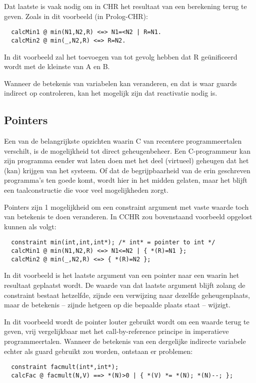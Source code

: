 Dat laatste is vaak nodig om in CHR het resultaat van een berekening terug te geven. Zoals in dit voorbeeld (in Prolog-CHR): \begin{Verbatim}
  calcMin1 @ min(N1,N2,R) <=> N1=<N2 | R=N1.
  calcMin2 @ min(_,N2,R) <=> R=N2.
\end{Verbatim}
In dit voorbeeld zal het toevoegen van  tot gevolg hebben dat R ge\"unificeerd wordt met de kleinste van A en B.

Wanneer de betekenis van variabelen kan veranderen, en dat is waar guards indirect op controleren, kan het mogelijk zijn dat reactivatie nodig is.

\subsection{Pointers}

Een van de belangrijkste opzichten waarin C van recentere programmeertalen verschilt, is de mogelijkheid tot direct geheugenbeheer. Een C-programmeur kan zijn programma eender wat laten doen met het deel (virtueel) geheugen dat het (kan) krijgen van het systeem. Of dat de begrijpbaarheid van de erin geschreven programma's ten goede komt, wordt hier in het midden gelaten, maar het blijft een taalconstructie die voor veel mogelijkheden zorgt.

Pointers zijn 1 mogelijkheid om een constraint argument met vaste waarde toch van betekenis te doen veranderen. In CCHR
zou bovenstaand voorbeeld opgelost kunnen als volgt: \begin{Verbatim}
  constraint min(int,int,int*); /* int* = pointer to int */
  calcMin1 @ min(N1,N2,R) <=> N1<=N2 | { *(R)=N1 };
  calcMin2 @ min(_,N2,R) <=> { *(R)=N2 };
\end{Verbatim}

In dit voorbeeld is het laatste argument van  een pointer naar een  waarin het resultaat geplaatst wordt. De waarde van dat laatste argument blijft zolang de constraint bestaat hetzelfde, zijnde een verwijzing naar dezelfde geheugenplaats, maar de betekenis -- zijnde hetgeen op die bepaalde plaats staat -- wijzigt.

In dit voorbeeld wordt de pointer louter gebruikt wordt om een waarde terug te geven, vrij vergelijkbaar met het call-by-reference principe in imperatieve programmeertalen. Wanneer de betekenis van een dergelijke indirecte variabele echter als guard gebruikt zou worden, ontstaan er problemen: \begin{Verbatim}
  constraint facmult(int*,int*);
  calcFac @ facmult(N,V) ==> *(N)>0 | { *(V) *= *(N); *(N)--; };
\end{Verbatim}

